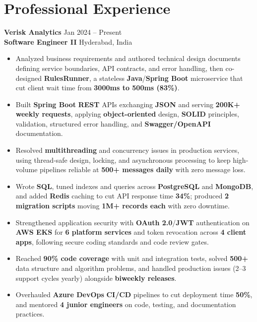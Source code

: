 \documentclass[a4paper,10pt]{article}
\begin{document}
\section*{Professional Experience}

\textbf{Verisk Analytics} \hfill Jan 2024 -- Present \\
\textbf{Software Engineer II} \hfill Hyderabad, India

\begin{itemize}[leftmargin=*]
    \item Analyzed business requirements and authored technical design documents defining service boundaries, API contracts, and error handling, then co-designed \textbf{RulesRunner}, a stateless \textbf{Java}/\textbf{Spring Boot} microservice that cut client wait time from \textbf{3000ms to 500ms (83\%)}.
    \item Built \textbf{Spring Boot} \textbf{REST} APIs exchanging \textbf{JSON} and serving \textbf{200K+ weekly requests}, applying \textbf{object-oriented} design, \textbf{SOLID} principles, validation, structured error handling, and \textbf{Swagger/OpenAPI} documentation.
    \item Resolved \textbf{multithreading} and concurrency issues in production services, using thread-safe design, locking, and asynchronous processing to keep high-volume pipelines reliable at \textbf{500+ messages daily} with zero message loss.
    \item Wrote \textbf{SQL}, tuned indexes and queries across \textbf{PostgreSQL} and \textbf{MongoDB}, and added \textbf{Redis} caching to cut API response time \textbf{34\%}; produced \textbf{2 migration scripts} moving \textbf{1M+ records each} with zero downtime.
    \item Strengthened application security with \textbf{OAuth 2.0}/\textbf{JWT} authentication on \textbf{AWS EKS} for \textbf{6 platform services} and token revocation across \textbf{4 client apps}, following secure coding standards and code review gates.
    \item Reached \textbf{90\% code coverage} with unit and integration tests, solved \textbf{500+} data structure and algorithm problems, and handled production issues (2--3 support cycles yearly) alongside \textbf{biweekly releases}.
    \item Overhauled \textbf{Azure DevOps} \textbf{CI/CD} pipelines to cut deployment time \textbf{50\%}, and mentored \textbf{4 junior engineers} on code, testing, and documentation practices.
\end{itemize}
\end{document}
